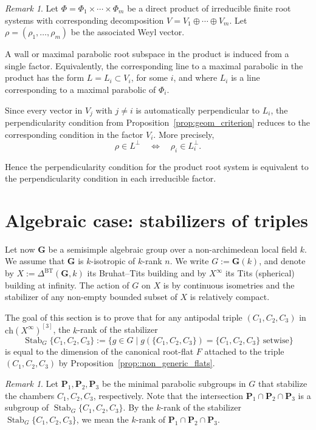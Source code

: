 \documentclass[11pt]{amsart}
\newcommand{\bfG}{\mathbf{G}}
\newcommand{\Ch}{\mathrm{ch}}
\DeclareMathOperator{\Stab}{Stab}
\theoremstyle{plain}
\theoremstyle{definition}
\theoremstyle{remark}
\newtheorem{rem}[thm]{Remark}
\begin{document}
	
	\begin{rem}
		Let $\Phi=\Phi_1\times\cdots\times\Phi_m$ be a direct product of irreducible finite root systems with corresponding decomposition $V=V_1\oplus\cdots\oplus V_m$. Let $\rho=(\rho_1,\dots,\rho_m)$ be the associated Weyl vector.
		
		A wall or maximal parabolic root subspace in the product is induced from a single factor. Equivalently, the corresponding line to a maximal parabolic in the product has the form $L=L_i\subset V_i$, for some $i$, and where $L_i$ is a line corresponding to a maximal parabolic of $\Phi_i$.
		
		Since every vector in $V_j$ with $j\neq i$ is automatically perpendicular to $L_i$, the perpendicularity condition from Proposition~\ref{prop:geom_criterion} reduces to the corresponding condition in the factor $V_i$. More precisely,
		\[
		\rho\in L^\perp
		\quad\Longleftrightarrow\quad
		\rho_i\in L_i^\perp.
		\]
		
		Hence the perpendicularity condition for the product root system is equivalent to the perpendicularity condition in each irreducible factor.
	\end{rem}

	
	
	
	\section{Algebraic case: stabilizers of triples}
	\label{sec::algebraic_case}
	
	Let now $\bfG$ be a semisimple algebraic group over a non-archimedean local field $k$. We assume that $\bfG$ is $k$-isotropic of $k$-rank $n$. We write $G:=\bfG(k)$, and denote by $X:=\Delta^{\mathrm{BT}}(\bfG,k)$ its Bruhat--Tits building and by $X^\infty$ its Tits (spherical) building at infinity. The action of $G$ on $X$ is by continuous isometries and the stabilizer of any non-empty bounded subset of $X$ is relatively compact.
	
	The goal of this section is to prove that for any antipodal triple $(C_1,C_2,C_3) $ in $\Ch(X^\infty)^{[3]}$, the $k$-rank of the stabilizer 
	$$\Stab_{G}\{C_1,C_2,C_3\} := \{g \in G \; \vert \; g(\{C_1,C_2,C_3\})= \{C_1,C_2,C_3\} \text{ setwise}\}$$
	 is equal to the dimension of the canonical root-flat $F$ attached to the triple $(C_1,C_2,C_3)$ by Proposition~\ref{prop::non_generic_flats}. 
	
	\begin{rem} Let $\mathbf{P}_1, \mathbf{P}_2, \mathbf{P}_3$ be the minimal parabolic subgroups in $G$ that stabilize the chambers $C_1, C_2, C_3$, respectively. Note that the intersection $\mathbf{P}_1 \cap \mathbf{P}_2 \cap \mathbf{P}_3$ is a subgroup of $\operatorname{Stab}_{G}\{C_1, C_2, C_3\}$. By the $k$-rank of the stabilizer $\operatorname{Stab}_{G}\{C_1, C_2, C_3\}$, we mean the $k$-rank of $\mathbf{P}_1 \cap \mathbf{P}_2 \cap \mathbf{P}_3$.

	\end{rem}
	
\end{document}
